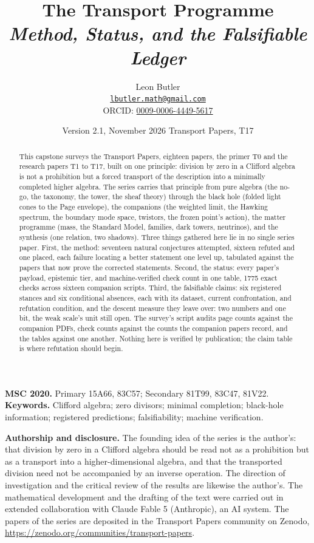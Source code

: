 \documentclass[11pt]{article}
\title{\bfseries The Transport Programme\\[4pt]
  \large\itshape Method, Status, and the Falsifiable Ledger}
\author{Leon Butler\\ \normalsize\href{mailto:lbutler.math@gmail.com}{\texttt{lbutler.math@gmail.com}}\\ \normalsize ORCID: \href{https://orcid.org/0009-0006-4449-5617}{0009-0006-4449-5617}}
\date{Version 2.1, November 2026 \textperiodcentered{} Transport Papers, T17}
\theoremstyle{definition}
\begin{document}
\maketitle

\begin{abstract}
\normalsize
This capstone surveys the Transport Papers, eighteen papers, the primer T0 and the research papers T1 to T17, built on one principle: division by zero in a Clifford algebra is not a prohibition but a forced transport of the description into a minimally completed higher algebra. The series carries that principle from pure algebra (the no-go, the taxonomy, the tower, the sheaf theory) through the black hole (folded light cones to the Page envelope), the companions (the weighted limit, the Hawking spectrum, the boundary mode space, twistors, the frozen point's action), the matter programme (mass, the Standard Model, families, dark towers, neutrinos), and the synthesis (one relation, two shadows). Three things gathered here lie in no single series paper. First, the method: seventeen natural conjectures attempted, sixteen refuted and one placed, each failure locating a better statement one level up, tabulated against the papers that now prove the corrected statements. Second, the status: every paper's payload, epistemic tier, and machine-verified check count in one table, 1775 exact checks across sixteen companion scripts. Third, the falsifiable claims: six registered stances and six conditional absences, each with its dataset, current confrontation, and refutation condition, and the descent measure they leave over: two numbers and one bit, the weak scale's unit still open. The survey's script audits page counts against the companion PDFs, check counts against the counts the companion papers record, and the tables against one another. Nothing here is verified by publication; the claim table is where refutation should begin.
\end{abstract}

\medskip
\noindent\textbf{MSC 2020.} Primary 15A66, 83C57; Secondary 81T99, 83C47, 81V22.\\
\textbf{Keywords.} Clifford algebra; zero divisors; minimal completion; black-hole information; registered predictions; falsifiability; machine verification.

\newpage
\textbf{Authorship and disclosure. }The founding idea of the series is the author's: that division by zero in a Clifford algebra should be read not as a prohibition but as a transport into a higher-dimensional algebra, and that the transported division need not be accompanied by an inverse operation. The direction of investigation and the critical review of the results are likewise the author's. The mathematical development and the drafting of the text were carried out in extended collaboration with Claude Fable 5 (Anthropic), an AI system. The papers of the series are deposited in the Transport Papers community on Zenodo, \url{https://zenodo.org/communities/transport-papers}.
\end{document}
